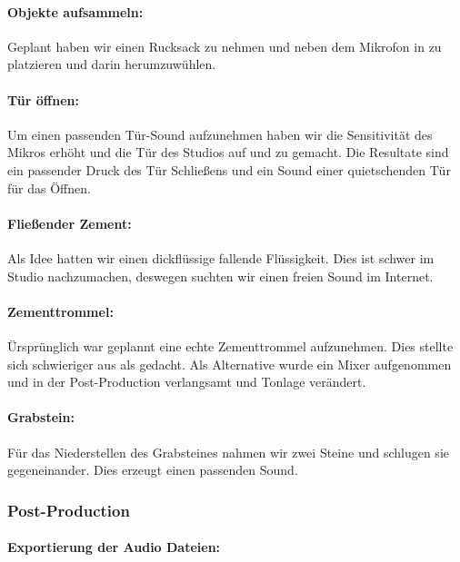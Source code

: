\paragraph{Objekte aufsammeln:}
Geplant haben wir einen Rucksack zu nehmen und neben dem Mikrofon in zu platzieren und darin herumzuwühlen.

\paragraph{Tür öffnen:}
Um einen passenden Tür-Sound aufzunehmen haben wir die Sensitivität des Mikros erhöht und die Tür des Studios auf und
zu gemacht. Die Resultate sind ein passender Druck des Tür Schließens und ein Sound einer quietschenden Tür für das Öffnen.

\paragraph{Fließender Zement:}
Als Idee hatten wir einen dickflüssige fallende Flüssigkeit. Dies ist schwer im Studio nachzumachen,
deswegen suchten wir einen freien Sound im Internet.

\paragraph{Zementtrommel:}
Ürsprünglich war geplannt eine echte Zementtrommel aufzunehmen. Dies stellte sich schwieriger
aus als gedacht. Als Alternative wurde ein Mixer aufgenommen und in der Post-Production verlangsamt und Tonlage verändert.

\paragraph{Grabstein:}
Für das Niederstellen des Grabsteines nahmen wir zwei Steine und schlugen sie gegeneinander. Dies erzeugt einen passenden Sound.


\subsubsection{Post-Production}

\paragraph{Exportierung der Audio Dateien:}
